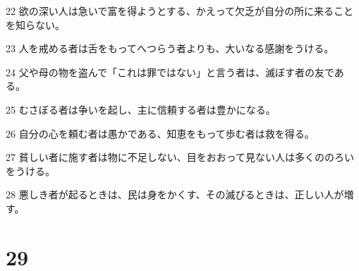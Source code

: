 \par 22 欲の深い人は急いで富を得ようとする、かえって欠乏が自分の所に来ることを知らない。
\par 23 人を戒める者は舌をもってへつらう者よりも、大いなる感謝をうける。
\par 24 父や母の物を盗んで「これは罪ではない」と言う者は、滅ぼす者の友である。
\par 25 むさぼる者は争いを起し、主に信頼する者は豊かになる。
\par 26 自分の心を頼む者は愚かである、知恵をもって歩む者は救を得る。
\par 27 貧しい者に施す者は物に不足しない、目をおおって見ない人は多くののろいをうける。
\par 28 悪しき者が起るときは、民は身をかくす、その滅びるときは、正しい人が増す。

\chapter{29}

